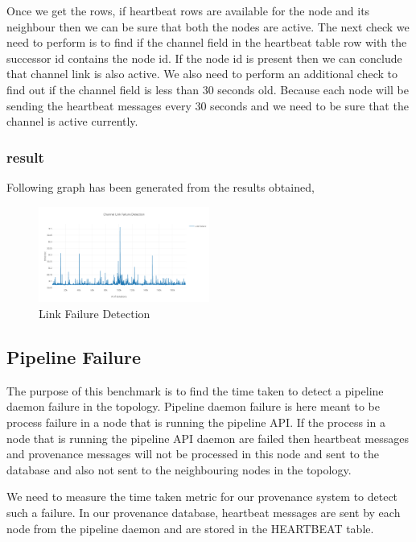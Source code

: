 Once we get the rows, if heartbeat rows are available for the node and its neighbour then we can be sure that both the nodes are active.
The next check we need to perform is to find if the channel field in the heartbeat table row with the successor id contains the node id.
If the node id is present then we can conclude that channel link is also active. We also need to perform an additional check to find out if the channel field is less than 30 seconds old. Because each node will be sending the heartbeat messages every 30 seconds and we need to be sure that the channel is active currently.

\subsubsection{result}

Following graph has been generated from the results obtained,

\begin{figure}[H]
	\center
	\includegraphics[width=0.5\textwidth]{figures/benchmark_link.png}
	\caption{Link Failure Detection}
	\label{fig:benchmark_link}
\end{figure}

\subsection{Pipeline Failure}

The purpose of this benchmark is to find the time taken to detect a pipeline daemon failure in the topology. Pipeline daemon failure is here meant to be process failure in a node that is running the pipeline API. If the process in a node that is running the pipeline API daemon are failed then heartbeat messages and provenance messages will not be processed in this node and sent to the database and also not sent to the neighbouring nodes in the topology.

We need to measure the time taken metric for our provenance system to detect such a failure. In our provenance database, heartbeat messages are sent by each node from the pipeline daemon and are stored in the HEARTBEAT table.

